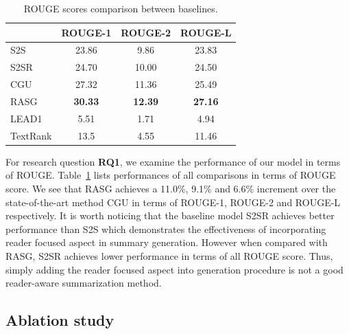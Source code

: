 \documentclass[letterpaper]{article} %
\newcommand{\dubbelop}{$^{\blacktriangle}$}
\begin{document}
\newcommand{\cbkgrnd}{\cellcolor{blue!15}}
\newcommand{\phantomtriangle}{\phantom{\dubbelop}}
\begin{table}[t]
\centering
\small
\caption{ROUGE scores comparison between baselines.}
\begin{tabular}{@{}l ccc @{}}
\toprule
& ROUGE-1 & ROUGE-2 & ROUGE-L \\
\midrule
S2S &  23.86 & 9.86 & 23.83 \\
S2SR &  24.70 & 10.00 & 24.50 \\
CGU & 27.32 & 11.36 & 25.49  \\
RASG & \textbf{30.33} & \textbf{12.39} & \textbf{27.16} \\
\midrule
LEAD1 & 5.51 & 1.71 & 4.94 \\
TextRank & 13.5 & 4.55 & 11.46 \\
\bottomrule
\end{tabular}
\label{tab:comp_rouge_baselines}
\end{table}

For research question \textbf{RQ1}, we examine the performance of our model in terms of ROUGE.
Table~\ref{tab:comp_rouge_baselines} lists performances of all comparisons in terms of ROUGE score.
We see that RASG achieves a 11.0\%, 9.1\% and 6.6\% increment over the state-of-the-art method CGU in terms of ROUGE-1, ROUGE-2 and ROUGE-L respectively.
It is worth noticing that the baseline model S2SR achieves better performance than S2S which demonstrates the effectiveness of incorporating reader focused aspect in summary generation.
However when compared with RASG, S2SR achieves lower performance in terms of all ROUGE score.
Thus, simply adding the reader focused aspect into generation procedure is not a good reader-aware summarization method.

\subsection{Ablation study}
\end{document}
